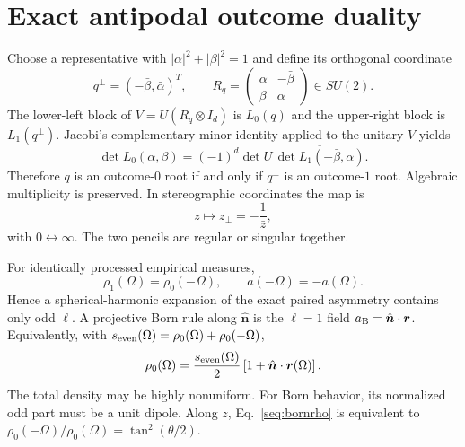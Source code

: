 \documentclass[aps,prl,onecolumn,10pt,notitlepage,superscriptaddress,nofootinbib]{revtex4-2}
\begin{document}
\section{Exact antipodal outcome duality}

Choose a representative with $|\alpha|^2+|\beta|^2=1$ and define its orthogonal coordinate
\begin{equation}
q^\perp=(-\bar\beta,\bar\alpha)^T,
\qquad
R_q=\begin{pmatrix}\alpha&-\bar\beta\\\beta&\bar\alpha\end{pmatrix}\in SU(2).
\end{equation}
The lower-left block of $V=U(R_q\otimes I_d)$ is $L_0(q)$ and the upper-right block is $L_1(q^\perp)$.  Jacobi's complementary-minor identity applied to the unitary $V$ yields
\begin{equation}
\det L_0(\alpha,\beta)
=(-1)^d\det U\,\overline{\det L_1(-\bar\beta,\bar\alpha)}.                   \label{seq:jacobi}
\end{equation}
Therefore $q$ is an outcome-$0$ root if and only if $q^\perp$ is an outcome-$1$ root.  Algebraic multiplicity is preserved.  In stereographic coordinates the map is
\begin{equation}
z\longmapsto z_\perp=-\frac{1}{\bar z},                                        \label{seq:antipode}
\end{equation}
with $0\leftrightarrow\infty$.  The two pencils are regular or singular together.

For identically processed empirical measures,
\begin{equation}
\rho_1(\Omega)=\rho_0(-\Omega),\qquad
a(-\Omega)=-a(\Omega).                                                         \label{seq:odd}
\end{equation}
Hence a spherical-harmonic expansion of the exact paired asymmetry contains only odd $\ell$.  A projective Born rule along $\hat{\bm n}$ is the $\ell=1$ field $a_{\rm B}=\hat{\bm n}\cdot\bm r$.  Equivalently, with $s_{\rm even}(\Omega)=\rho_0(\Omega)+\rho_0(-\Omega)$,
\begin{equation}
\rho_0(\Omega)=\frac{s_{\rm even}(\Omega)}{2}
\left[1+\hat{\bm n}\cdot\bm r(\Omega)\right].                              \label{seq:bornrho}
\end{equation}
The total density may be highly nonuniform.  For Born behavior, its normalized odd part must be a unit dipole.  Along $z$, Eq.~\eqref{seq:bornrho} is equivalent to $\rho_0(-\Omega)/\rho_0(\Omega)=\tan^2(\theta/2)$.
\end{document}
